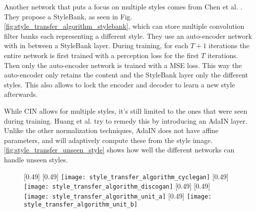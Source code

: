 Another network that puts a focus on multiple styles comes from Chen et al. \cite{Chen2017}.
They propose a StyleBank, as seen in Fig. \ref{fig:style_transfer_algorithm_stylebank}, which can store multiple convolution filter banks each representing a different style.
They use an auto-encoder network with in between a StyleBank layer.
During training, for each $T+1$ iterations the entire network is first trained with a perception loss for the first $T$ iterations.
Then only the auto-encoder network is trained with a \gls{MSE} loss.
This way the auto-encoder only retains the content and the StyleBank layer only the different styles.
This also allows to lock the encoder and decoder to learn a new style afterwards.

While \gls{CIN} allows for multiple styles, it's still limited to the ones that were seen during training.
Huang et al. \cite{Huang2017} try to remedy this by introducing an \gls{AdaIN} layer.
Unlike the other normalization techniques, \gls{AdaIN} does not have affine parameters, and will adaptively compute these from the style image.
\ref{fig:style_transfer_unseen_style} shows how well the different networks can handle unseen styles.

\begin{figure}
	\centering
	[0.49\textwidth] {	
		[0.49\textwidth]{%
			\texttt{[image: style\_transfer\_algorithm\_cyclegan]}%
		}
		[0.49\textwidth]{%
			\texttt{[image: style\_transfer\_algorithm\_discogan]}%
		}
		\label{fig:style_transfer_cyclegan}
	}
	[0.49\textwidth] {	
		[0.49\textwidth]{%
			\texttt{[image: style\_transfer\_algorithm\_unit\_a]}%
		}
		[0.49\textwidth]{%
			\texttt{[image: style\_transfer\_algorithm\_unit\_b]}%
		}
		\label{fig:style_transfer_algorithm_unit}
	}
\end{figure}

